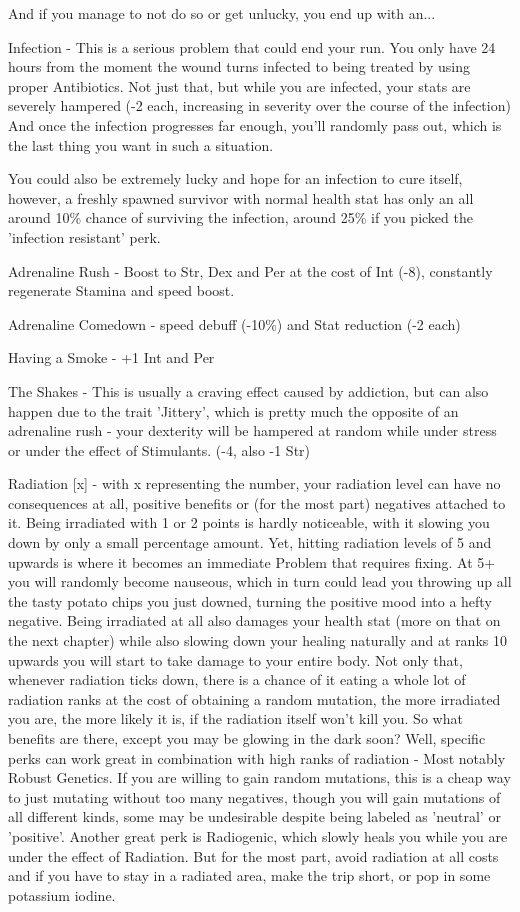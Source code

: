 And if you manage to not do so or get unlucky, you end up with an...

Infection - This is a serious problem that could end your run. You only have 24 hours from the moment the wound turns infected to being treated by using proper Antibiotics. Not just that, but while you are infected, your stats are severely hampered (-2 each, increasing in severity over the course of the infection) And once the infection progresses far enough, you'll randomly pass out, which is the last thing you want in such a situation.

You could also be extremely lucky and hope for an infection to cure itself, however, a freshly spawned survivor with normal health stat has only an all around 10\% chance of surviving the infection, around 25\% if you picked the 'infection resistant' perk.

Adrenaline Rush - Boost to Str, Dex and Per at the cost of Int (-8), constantly regenerate Stamina and speed boost.

Adrenaline Comedown - speed debuff (-10\%) and Stat reduction (-2 each)

Having a Smoke - +1 Int and Per

The Shakes - This is usually a craving effect caused by addiction, but can also happen due to the trait 'Jittery', which is pretty much the opposite of an adrenaline rush - your dexterity will be hampered at random while under stress or under the effect of Stimulants. (-4, also -1 Str)

Radiation [x] - with x representing the number, your radiation level can have no consequences at all, positive benefits or (for the most part) negatives attached to it. Being irradiated with 1 or 2 points is hardly noticeable, with it slowing you down by only a small percentage amount. Yet, hitting radiation levels of 5 and upwards is where it becomes an immediate Problem that requires fixing. At 5+ you will randomly become nauseous, which in turn could lead you throwing up all the tasty potato chips you just downed, turning the positive mood into a hefty negative. Being irradiated at all also damages your health stat (more on that on the next chapter) while also slowing down your healing naturally and at ranks 10 upwards you will start to take damage to your entire body. Not only that, whenever radiation ticks down, there is a chance of it eating a whole lot of radiation ranks at the cost of obtaining a random mutation, the more irradiated you are, the more likely it is, if the radiation itself won't kill you. So what benefits are there, except you may be glowing in the dark soon? Well, specific perks can work great in combination with high ranks of radiation - Most notably Robust Genetics. If you are willing to gain random mutations, this is a cheap way to just mutating without too many negatives, though you will gain mutations of all different kinds, some may be undesirable despite being labeled as 'neutral' or 'positive'. Another great perk is Radiogenic, which slowly heals you while you are under the effect of Radiation. But for the most part, avoid radiation at all costs and if you have to stay in a radiated area, make the trip short, or pop in some potassium iodine.

